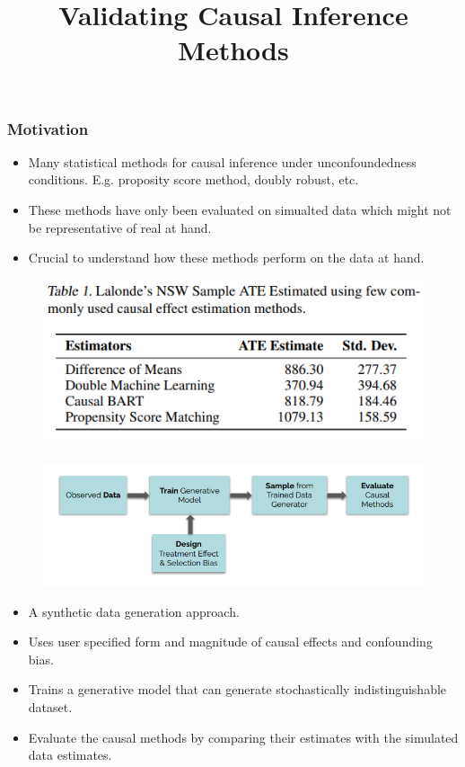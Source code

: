\documentclass{beamer}
\begin{document}
\title[]{Validating Causal Inference Methods}
\author [] {}
\date{}

\begin{frame}
	\frametitle{Motivation}
	\begin{itemize}
		\item Many statistical methods for causal inference under unconfoundedness conditions. E.g. proposity score method, doubly robust, etc.
		\item These methods have only been evaluated on simualted data which might not be representative of real at hand.
		\item Crucial to understand how these methods perform on the data at hand.
	\end{itemize}
	\begin{figure}
		\includegraphics[scale=0.6]{imgs/comparison.png}
	\end{figure}
\end{frame}

\begin{frame}
	\frametitle{}
	\vspace{-2em}
	\begin{figure}
		\centering
		\includegraphics[scale=0.65]{imgs/flow.png}
	\end{figure}
	\vspace{-1.5em}
	\begin{itemize}
		\item A synthetic data generation approach.
		\item Uses user specified form and magnitude of causal effects
			and confounding bias.
		\item Trains a generative model that can generate
			stochastically indistinguishable dataset.
		\item Evaluate the causal methods by comparing their estimates
			with the simulated data estimates.
	\end{itemize}
\end{frame}
\end{document}
